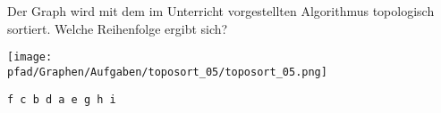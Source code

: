 \question[4]
Der Graph wird mit dem im Unterricht vorgestellten Algorithmus topologisch
sortiert. Welche Reihenfolge ergibt sich?

\texttt{[image: \\pfad/Graphen/Aufgaben/toposort\_05/toposort\_05.png]}
\begin{solutionbox}{2cm}
\begin{lstlisting}
f c b d a e g h i
\end{lstlisting}
\end{solutionbox}
